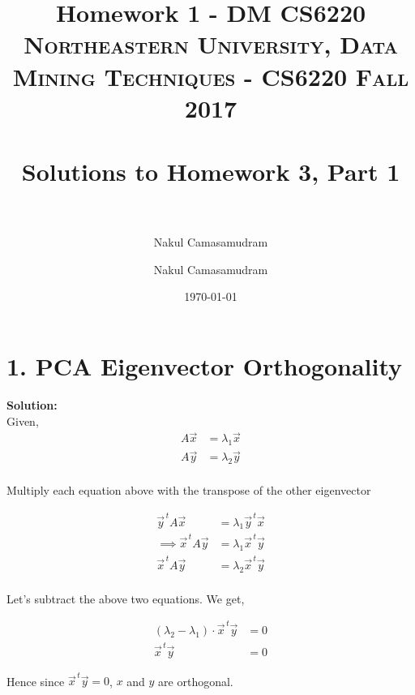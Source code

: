 \documentclass[11pt]{article}
\title{Homework 1 - DM CS6220}
\author{Nakul Camasamudram}
\title{	
	\normalfont \normalsize 
	\textsc{Northeastern University, Data Mining Techniques - CS6220 Fall 2017} \\
	\horrule{0.5pt} \\[0.4cm] %
	\huge Solutions to Homework 3, Part 1 \\ %
	\horrule{2pt} \\[0.5cm] %
	}
\author{Nakul Camasamudram} %
\date{\normalsize\today} %
\begin{document}
	
	\maketitle %
	\newpage

\section*{1. PCA Eigenvector Orthogonality}

\textbf{Solution:}\\

\noindent
Given,
\begin{align*}
	A\vec{x} &= \lambda_{1}\vec{x}\\
	A\vec{y} &= \lambda_{2}\vec{y}\\
\end{align*}

Multiply each equation above with the transpose of the other eigenvector

\begin{align*}
	\vec{y}^{\, t}A\vec{x} &= \lambda_{1}\vec{y}^{\, t}\vec{x}\\
	\implies \vec{x}^{\, t}A\vec{y} &= \lambda_{1}\vec{x}^{\, t}\vec{y}\\
	\vec{x}^{\, t}A\vec{y} &= \lambda_{2}\vec{x}^{\, t}\vec{y}\\
\end{align*}

Let's subtract the above two equations. We get,

\begin{align*}
	(\lambda_{2} - \lambda_1) \cdot \vec{x}^{\, t} \vec{y} &= 0 \\
	\vec{x}^{\, t} \vec{y} &= 0
\end{align*}


Hence since $\vec{x}^{\, t} \vec{y} = 0$, $x$ and $y$ are orthogonal.
\end{document}
